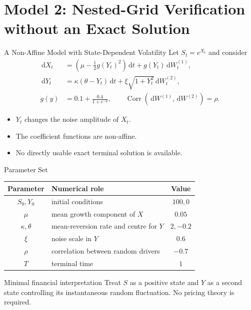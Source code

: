 \documentclass[aspectratio=169,10pt]{beamer}
\newcommand{\dd}{\,\mathrm{d}}
\begin{document}
\section{Model 2: Nested-Grid Verification without an Exact Solution}

\begin{frame}{A Non-Affine Model with State-Dependent Volatility}
  Let $S_t=e^{X_t}$ and consider
  \begin{align*}
    \dd X_t&=\left(\mu-\frac12g(Y_t)^2\right)\dd t+g(Y_t)\dd W_t^{(1)},\\
    \dd Y_t&=\kappa(\theta-Y_t)\dd t
      +\xi\sqrt{1+Y_t^2}\dd W_t^{(2)},\\
    g(y)&=0.1+\frac{0.4}{1+e^{-y}},
    \qquad \operatorname{Corr}(\dd W^{(1)},\dd W^{(2)})=\rho.
  \end{align*}
  \begin{itemize}
    \item $Y_t$ changes the noise amplitude of $X_t$.
    \item The coefficient functions are non-affine.
    \item No directly usable exact terminal solution is available.
  \end{itemize}
\end{frame}

\begin{frame}{Parameter Set}
  \begin{center}
    \begin{tabular}{clc}
      \toprule
      Parameter & Numerical role & Value \\
      \midrule
      $S_0,Y_0$ & initial conditions & $100,0$ \\
      $\mu$ & mean growth component of $X$ & $0.05$ \\
      $\kappa,\theta$ & mean-reversion rate and centre for $Y$ & $2,-0.2$ \\
      $\xi$ & noise scale in $Y$ & $0.6$ \\
      $\rho$ & correlation between random drivers & $-0.7$ \\
      $T$ & terminal time & $1$ \\
      \bottomrule
    \end{tabular}
  \end{center}
  \begin{block}{Minimal financial interpretation}
    Treat $S$ as a positive state and $Y$ as a second state controlling its
    instantaneous random fluctuation. No pricing theory is required.
  \end{block}
\end{frame}
\end{document}
